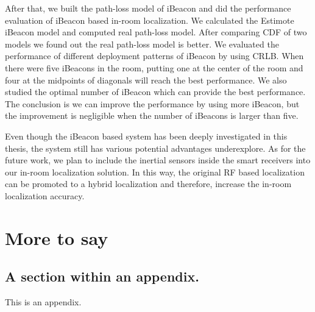 \documentclass[12pt]{report}
\begin{document}
After that, we built the path-loss model of iBeacon and did the performance evaluation of iBeacon based in-room localization. We calculated the Estimote iBeacon model and computed real path-loss model. After comparing CDF of two models we found out the real path-loss model is better. We evaluated the performance of different deployment patterns of iBeacon by using CRLB. When there were five iBeacons in the room, putting one at the center of the room and four at the midpoints of diagonals will reach the best performance. We also studied the optimal number of iBeacon which can provide the best performance. The conclusion is we can improve the performance by using more iBeacon, but the improvement is negligible when the number of iBeacons is larger than five.

Even though the iBeacon based system has been deeply investigated in this thesis, the system still has various potential advantages underexplore. As for the future work, we plan to include the inertial sensors inside the smart receivers into our in-room localization solution. In this way, the original RF based localization can be promoted to a hybrid localization and therefore, increase the in-room localization accuracy.




\appendix

\chapter{More to say}

\section{A section within an appendix.}
This is an appendix.




\singlespacing

%
%
%
\end{document}
